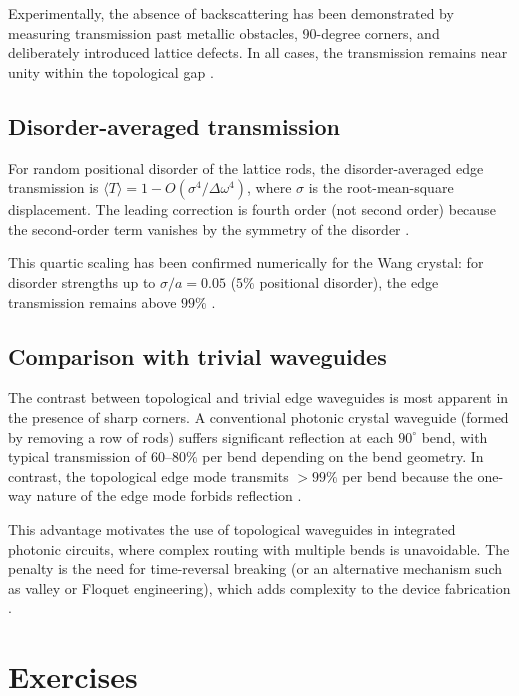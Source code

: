 Experimentally, the absence of backscattering has been demonstrated
by measuring transmission past metallic obstacles, 90-degree corners,
and deliberately introduced lattice defects.  In all cases, the
transmission remains near unity within the topological gap
\cite{nature2026observation,hafezi2013imaging}.

\subsection{Disorder-averaged transmission}
\label{sec:ch8-disorder-average}

For random positional disorder of the lattice rods, the
disorder-averaged edge transmission is
$\langle T\rangle = 1 - O(\sigma^4/\Delta\omega^4)$, where $\sigma$
is the root-mean-square displacement.  The leading correction is
fourth order (not second order) because the second-order term
vanishes by the symmetry of the disorder
\cite{ozawa2018topological,ma2017scattering}.

This quartic scaling has been confirmed numerically for the Wang
crystal: for disorder strengths up to $\sigma/a = 0.05$
($5\%$ positional disorder), the edge transmission remains above
$99\%$ \cite{zhao2020first}.

\subsection{Comparison with trivial waveguides}
\label{sec:ch8-comparison-trivial}

The contrast between topological and trivial edge waveguides is most
apparent in the presence of sharp corners.  A conventional photonic
crystal waveguide (formed by removing a row of rods) suffers
significant reflection at each $90^\circ$ bend, with typical
transmission of $60$--$80\%$ per bend depending on the bend geometry.
In contrast, the topological edge mode transmits $>99\%$ per bend
because the one-way nature of the edge mode forbids reflection
\cite{price2022roadmap,gao2017topologically}.

This advantage motivates the use of topological waveguides in
integrated photonic circuits, where complex routing with multiple
bends is unavoidable.  The penalty is the need for time-reversal
breaking (or an alternative mechanism such as valley or Floquet
engineering), which adds complexity to the device fabrication
\cite{he2019silicon,rechtsman2013photonic}.

\section*{Exercises}

